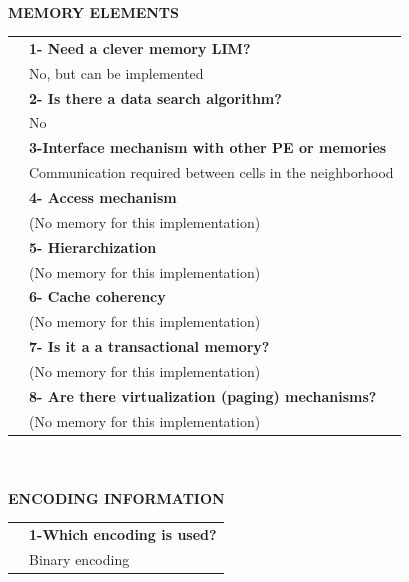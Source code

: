\newpage{\large \textbf{\qquad }}\vspace{10pt}\\
{\large \textbf{MEMORY ELEMENTS}}\vspace{10pt}\\\begin{tabular}{ p{0.2cm} p{14.5cm}}
	&\textbf{1- Need a clever memory LIM?}\\
	&	No, but can be implemented\vspace{7pt}\\
	&\textbf{2- Is there a data search algorithm?}\\
	&	No\vspace{7pt}\\
	&\textbf{	3-Interface mechanism with other PE or memories}\\
	&	Communication required between cells in the neighborhood\vspace{7pt}\\
	&	\textbf{4- Access mechanism}\\
	&	(No memory for this implementation)\vspace{7pt}\\
	&	\textbf{5- Hierarchization} \\
	&	(No memory for this implementation)\vspace{7pt}\\
	&\textbf{	6- Cache coherency} \\
	&	(No memory for this implementation)\vspace{7pt}\\
	&\textbf{	7- Is it a a transactional memory?}\\
	&	(No memory for this implementation)\vspace{7pt}\\
	&\textbf{	8- Are there virtualization (paging) mechanisms?}\\
	&	(No memory for this implementation)\end{tabular}\vspace{14pt}\\
\vspace{10pt}\\
{\large\textbf{ENCODING INFORMATION}}\vspace{10pt}\\
\begin{tabular}{ p{0.2cm} p{14.5cm}}
	&\textbf{1-Which encoding is used?}\\
	&Binary encoding
\end{tabular}
\newpage{\large\textbf{ }}\vspace{10pt}\\
